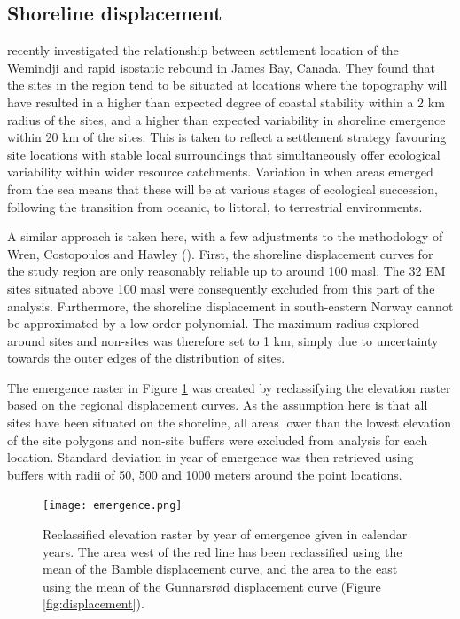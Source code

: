 \documentclass[12pt, a4paper]{article}
\begin{document}
\subsection{Shoreline displacement}
\cite{wren2018} recently investigated the relationship between settlement location of the Wemindji and rapid isostatic rebound in James Bay, Canada. They found that the sites in the region tend to be situated at locations where the topography will have resulted in a higher than expected degree of coastal stability within a 2 km radius of the sites, and a higher than expected variability in shoreline emergence within 20 km of the sites. This is taken to reflect a settlement strategy favouring site locations with stable local surroundings that simultaneously offer ecological variability within wider resource catchments. Variation in when areas emerged from the sea means that these will be at various stages of ecological succession, following the transition from oceanic, to littoral, to terrestrial environments. \par 
A similar approach is taken here, with a few adjustments to the methodology of Wren, Costopoulos and Hawley (\citeyear[][]{wren2018}). First, the shoreline displacement curves for the study region are only reasonably reliable up to around 100 masl. The 32 EM sites situated above 100 masl were consequently excluded from this part of the analysis. Furthermore, the shoreline displacement in south-eastern Norway cannot be approximated by a low-order polynomial. The maximum radius explored around sites and non-sites was therefore set to 1 km, simply due to uncertainty towards the outer edges of the distribution of sites. \par The emergence raster in Figure \ref{fig:emerge} was created by reclassifying the elevation raster based on the regional displacement curves. As the assumption here is that all sites have been situated on the shoreline, all areas lower than the lowest elevation of the site polygons and non-site buffers were excluded from analysis for each location. Standard deviation in year of emergence was then retrieved using buffers with radii of 50, 500 and 1000 meters around the point locations. \par

\begin{figure}
	\centering
	\texttt{[image: emergence.png]}
	\caption{Reclassified elevation raster by year of emergence given in calendar years. The area west of the red line has been reclassified using the mean of the Bamble displacement curve, and the area to the east using the mean of the Gunnarsr{\o}d displacement curve (Figure \ref{fig:displacement}).}
	\label{fig:emerge}
\end{figure} 
\end{document}
